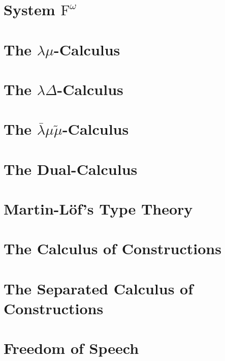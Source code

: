 \documentclass[phd,appendix,dedicationpage,ackpage,epigraphpage]{uithesis}
\newcommand{\LBMMT}[0]{\bar{\lambda}\mu\tilde\mu}
\begin{document}
\newpage
\section{System $\text{F}^\omega$}
\label{sec:system_fw}
\Fwall{}

\newpage
\section{The $\lambda\mu$-Calculus}
\label{sec:lamu_all}
\Lamuall{}

\newpage
\section{The $\lambda\Delta$-Calculus}
\label{sec:lamd_all}
\Lamdall{}

\newpage
\section{The $\LBMMT$-Calculus}
\label{sec:lbmmt_all}
\LBMMTall{}

\newpage
\section{The Dual-Calculus}
\label{sec:dc_all}
\DCall{}

\newpage
\section{Martin-L\"of's Type Theory}
\label{sec:tt_all}
\TTall{}

\newpage
\section{The Calculus of Constructions}
\label{sec:coc_all}
\CoCall{}

\newpage
\section{The Separated Calculus of Constructions}
\label{sec:coc_sep_all}
\CoCSall{}

\newpage
\section{Freedom of Speech}
\label{sec:freedom_of_speech_all}
\FSall{}
\end{document}
